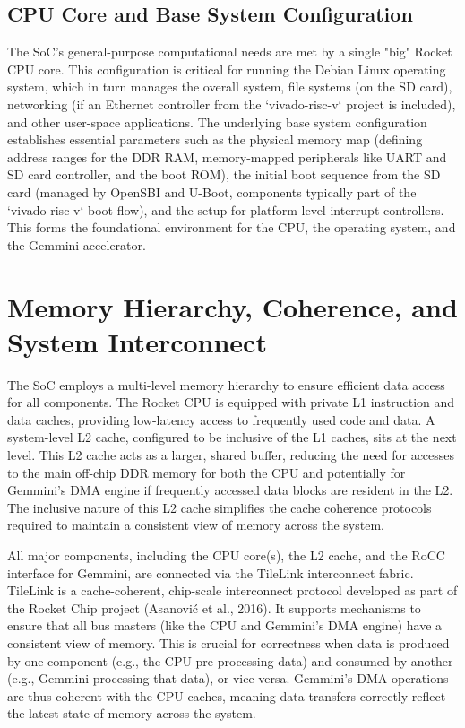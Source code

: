 \subsection{CPU Core and Base System Configuration}
\label{sec:cpu_base_config}

The SoC's general-purpose computational needs are met by a single "big" Rocket CPU core. This configuration is critical for running the Debian Linux operating system, which in turn manages the overall system, file systems (on the SD card), networking (if an Ethernet controller from the `vivado-risc-v` project is included), and other user-space applications. The underlying base system configuration establishes essential parameters such as the physical memory map (defining address ranges for the DDR RAM, memory-mapped peripherals like UART and SD card controller, and the boot ROM), the initial boot sequence from the SD card (managed by OpenSBI and U-Boot, components typically part of the `vivado-risc-v` boot flow), and the setup for platform-level interrupt controllers. This forms the foundational environment for the CPU, the operating system, and the Gemmini accelerator.

\section{Memory Hierarchy, Coherence, and System Interconnect}
\label{sec:memory_coherence_interconnect}
The SoC employs a multi-level memory hierarchy to ensure efficient data access for all components. The Rocket CPU is equipped with private L1 instruction and data caches, providing low-latency access to frequently used code and data. A system-level L2 cache, configured to be inclusive of the L1 caches, sits at the next level. This L2 cache acts as a larger, shared buffer, reducing the need for accesses to the main off-chip DDR memory for both the CPU and potentially for Gemmini's DMA engine if frequently accessed data blocks are resident in the L2. The inclusive nature of this L2 cache simplifies the cache coherence protocols required to maintain a consistent view of memory across the system.

All major components, including the CPU core(s), the L2 cache, and the RoCC interface for Gemmini, are connected via the TileLink interconnect fabric. TileLink is a cache-coherent, chip-scale interconnect protocol developed as part of the Rocket Chip project (Asanović et al., 2016). It supports mechanisms to ensure that all bus masters (like the CPU and Gemmini's DMA engine) have a consistent view of memory. This is crucial for correctness when data is produced by one component (e.g., the CPU pre-processing data) and consumed by another (e.g., Gemmini processing that data), or vice-versa. Gemmini's DMA operations are thus coherent with the CPU caches, meaning data transfers correctly reflect the latest state of memory across the system.

